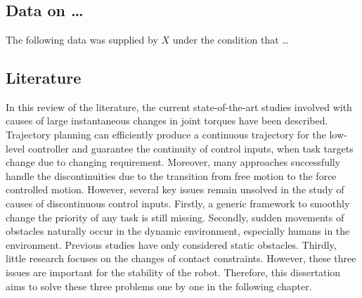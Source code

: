 
\chapter[Appendix]{}
\label{appendix-b}


\section{Data on \ldots}
The following data was supplied by $X$ under the condition that \ldots

\section{Literature}
In this review of the literature, the current state-of-the-art studies involved with causes of large instantaneous changes in joint torques have been described. Trajectory planning can efficiently produce a continuous trajectory for the low-level controller and guarantee the continuity of control inputs, when task targets change due to changing requirement. Moreover, many approaches successfully handle the discontinuities due to the transition from free motion to the force controlled motion. However, several key issues remain unsolved in the study of causes of discontinuous control inputs. Firstly, a generic framework to smoothly change the priority of any task is still missing. Secondly, sudden movements of obstacles naturally occur in the dynamic environment, especially humans in the environment. Previous studies have only considered static obstacles. Thirdly, little research focuses on the changes of contact constraints. However, these three issues are important for the stability of the robot. Therefore, this dissertation aims to solve these three problems one by one in the following chapter. 








